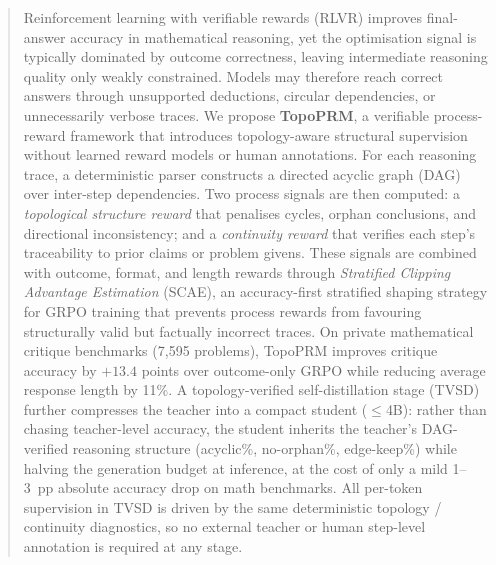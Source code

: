 \begin{abstract}
Reinforcement learning with verifiable rewards (RLVR) improves final-answer accuracy in mathematical reasoning, yet the optimisation signal is typically dominated by outcome correctness, leaving intermediate reasoning quality only weakly constrained.
Models may therefore reach correct answers through unsupported deductions, circular dependencies, or unnecessarily verbose traces.
We propose \textbf{TopoPRM}, a verifiable process-reward framework that introduces topology-aware structural supervision without learned reward models or human annotations.
For each reasoning trace, a deterministic parser constructs a directed acyclic graph (DAG) over inter-step dependencies.
Two process signals are then computed: a \emph{topological structure reward} that penalises cycles, orphan conclusions, and directional inconsistency; and a \emph{continuity reward} that verifies each step's traceability to prior claims or problem givens.
These signals are combined with outcome, format, and length rewards through \emph{Stratified Clipping Advantage Estimation} (SCAE), an accuracy-first stratified shaping strategy for GRPO training that prevents process rewards from favouring structurally valid but factually incorrect traces.
On private mathematical critique benchmarks (7{,}595 problems), TopoPRM improves critique accuracy by $+13.4$ points over outcome-only GRPO while reducing average response length by 11\%.
A topology-verified self-distillation stage (TVSD) further compresses the teacher into a compact student ($\leq$4B): rather than chasing teacher-level accuracy, the student inherits the teacher's DAG-verified reasoning structure (acyclic\%, no-orphan\%, edge-keep\%) while halving the generation budget at inference, at the cost of only a mild 1--3~pp absolute accuracy drop on math benchmarks. All per-token supervision in TVSD is driven by the same deterministic topology / continuity diagnostics, so no external teacher or human step-level annotation is required at any stage.
\end{abstract}
